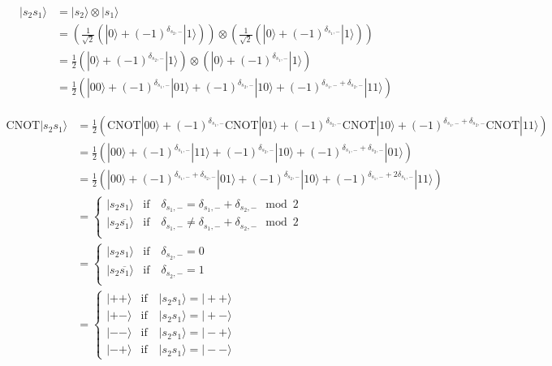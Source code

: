 \documentclass{article}
\begin{document}
  \begin{align*}
    |s_2s_1\rangle &= |s_2\rangle\otimes|s_1\rangle\\
    &= \left(\frac{1}{\sqrt{2}}\left(|0\rangle + (-1)^{\delta_{s_2, -}}|1\rangle\right)\right)\otimes\left(\frac{1}{\sqrt{2}}\left(|0\rangle + (-1)^{\delta_{s_1, -}}|1\rangle\right)\right)\\
    &= \frac{1}{2}\left(|0\rangle + (-1)^{\delta_{s_2, -}}|1\rangle\right)\otimes \left(|0\rangle + (-1)^{\delta_{s_1, -}}|1\rangle\right)\\
    &= \frac{1}{2}\left(|00\rangle + (-1)^{\delta_{s_1, -}} |01\rangle + (-1)^{\delta_{s_2, -}} |10\rangle + (-1)^{\delta_{s_1, -} + \delta_{s_2, -}} |11\rangle\right)
  \end{align*}

  \begin{align*}
    \text{CNOT}|s_2s_1\rangle &= \frac{1}{2}\left(\text{CNOT}|00\rangle + (-1)^{\delta_{s_1, -}} \text{CNOT}|01\rangle + (-1)^{\delta_{s_2, -}} \text{CNOT}|10\rangle + (-1)^{\delta_{s_1, -} + \delta_{s_2, -}} \text{CNOT}|11\rangle\right)\\
    &= \frac{1}{2}\left(|00\rangle + (-1)^{\delta_{s_1, -}} |11\rangle + (-1)^{\delta_{s_2, -}} |10\rangle + (-1)^{\delta_{s_1, -} + \delta_{s_2, -}} |01\rangle\right)\\
    &= \frac{1}{2}\left(|00\rangle + (-1)^{\delta_{s_1, -} + \delta_{s_2, -}} |01\rangle + (-1)^{\delta_{s_2, -}} |10\rangle + (-1)^{\delta_{s_1, -} + 2\delta_{s_1, -}} |11\rangle\right)\\
    &= \begin{cases}
      |s_2s_1\rangle & \text{if}\quad \delta_{s_1, -} = \delta_{s_1, -} + \delta_{s_2, -} \mod 2\\
      |s_2\overline{s_1}\rangle & \text{if}\quad \delta_{s_1, -} \neq \delta_{s_1, -} + \delta_{s_2, -} \mod 2\\
    \end{cases}\\
    &= \begin{cases}
      |s_2s_1\rangle & \text{if}\quad \delta_{s_2, -} = 0\\
      |s_2\overline{s_1}\rangle & \text{if}\quad \delta_{s_2, -} = 1\\
    \end{cases}\\
    &= \begin{cases}
        |++\rangle&\text{if}\quad|s_2s_1\rangle = |++\rangle\\
        |+-\rangle&\text{if}\quad|s_2s_1\rangle = |+-\rangle\\
        |--\rangle&\text{if}\quad|s_2s_1\rangle = |-+\rangle\\
        |-+\rangle&\text{if}\quad|s_2s_1\rangle = |--\rangle
    \end{cases}
  \end{align*}
\end{document}
